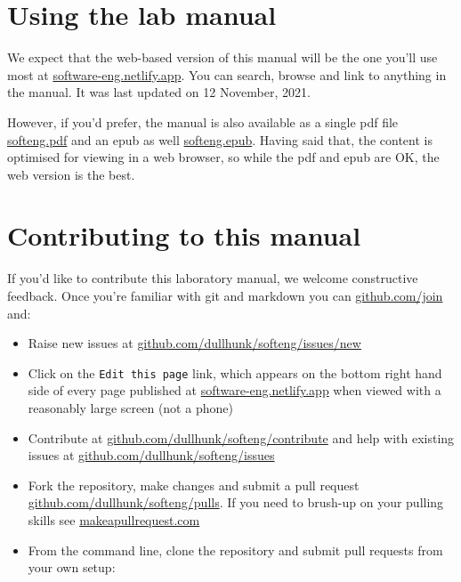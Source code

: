 \documentclass[
]{book}
\providecommand{\tightlist}{%
  \setlength{\itemsep}{0pt}\setlength{\parskip}{0pt}}
\begin{document}
\hypertarget{usingit}{%
\section{Using the lab manual}\label{usingit}}

We expect that the web-based version of this manual will be the one you'll use most at \href{https://software-eng.netlify.app/}{software-eng.netlify.app}. You can search, browse and link to anything in the manual. It was last updated on 12 November, 2021.

However, if you'd prefer, the manual is also available as a single pdf file \href{https://software-eng.netlify.app/softeng.pdf}{softeng.pdf} and an epub as well \href{https://software-eng.netlify.app/softeng.epub}{softeng.epub}. Having said that, the content is optimised for viewing in a web browser, so while the pdf and epub are OK, the web version is the best.

\hypertarget{contributing}{%
\section{Contributing to this manual}\label{contributing}}

If you'd like to contribute this laboratory manual, we welcome constructive feedback. Once you're familiar with git and markdown you can \href{https://github.com/join}{github.com/join} and:

\begin{itemize}
\tightlist
\item
  Raise new issues at \href{https://github.com/dullhunk/softeng/issues/new}{github.com/dullhunk/softeng/issues/new}
\item
  Click on the \texttt{Edit\ this\ page} link, which appears on the bottom right hand side of every page published at \href{https://software-eng.netlify.app}{software-eng.netlify.app} when viewed with a reasonably large screen (not a phone)
\item
  Contribute at \href{https://github.com/dullhunk/softeng/contribute}{github.com/dullhunk/softeng/contribute} and help with existing issues at \href{https://github.com/dullhunk/softeng/issues}{github.com/dullhunk/softeng/issues}
\item
  Fork the repository, make changes and submit a pull request \href{https://github.com/dullhunk/softeng/pulls}{github.com/dullhunk/softeng/pulls}. If you need to brush-up on your pulling skills see \href{http://makeapullrequest.com/}{makeapullrequest.com}
\item
  From the command line, clone the repository and submit pull requests from your own setup:
\end{itemize}
\end{document}
